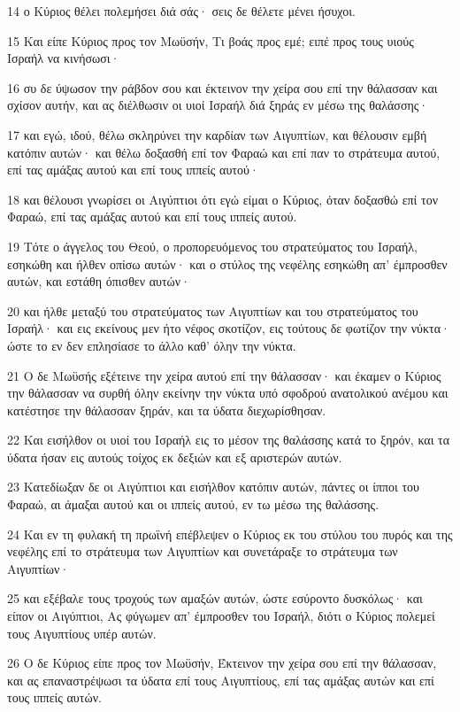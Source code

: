 \par 14 ο Κύριος θέλει πολεμήσει διά σάς· σεις δε θέλετε μένει ήσυχοι.
\par 15 Και είπε Κύριος προς τον Μωϋσήν, Τι βοάς προς εμέ; ειπέ προς τους υιούς Ισραήλ να κινήσωσι·
\par 16 συ δε ύψωσον την ράβδον σου και έκτεινον την χείρα σου επί την θάλασσαν και σχίσον αυτήν, και ας διέλθωσιν οι υιοί Ισραήλ διά ξηράς εν μέσω της θαλάσσης·
\par 17 και εγώ, ιδού, θέλω σκληρύνει την καρδίαν των Αιγυπτίων, και θέλουσιν εμβή κατόπιν αυτών· και θέλω δοξασθή επί τον Φαραώ και επί παν το στράτευμα αυτού, επί τας αμάξας αυτού και επί τους ιππείς αυτού·
\par 18 και θέλουσι γνωρίσει οι Αιγύπτιοι ότι εγώ είμαι ο Κύριος, όταν δοξασθώ επί τον Φαραώ, επί τας αμάξας αυτού και επί τους ιππείς αυτού.
\par 19 Τότε ο άγγελος του Θεού, ο προπορευόμενος του στρατεύματος του Ισραήλ, εσηκώθη και ήλθεν οπίσω αυτών· και ο στύλος της νεφέλης εσηκώθη απ' έμπροσθεν αυτών, και εστάθη όπισθεν αυτών·
\par 20 και ήλθε μεταξύ του στρατεύματος των Αιγυπτίων και του στρατεύματος του Ισραήλ· και εις εκείνους μεν ήτο νέφος σκοτίζον, εις τούτους δε φωτίζον την νύκτα· ώστε το εν δεν επλησίασε το άλλο καθ' όλην την νύκτα.
\par 21 Ο δε Μωϋσής εξέτεινε την χείρα αυτού επί την θάλασσαν· και έκαμεν ο Κύριος την θάλασσαν να συρθή όλην εκείνην την νύκτα υπό σφοδρού ανατολικού ανέμου και κατέστησε την θάλασσαν ξηράν, και τα ύδατα διεχωρίσθησαν.
\par 22 Και εισήλθον οι υιοί του Ισραήλ εις το μέσον της θαλάσσης κατά το ξηρόν, και τα ύδατα ήσαν εις αυτούς τοίχος εκ δεξιών και εξ αριστερών αυτών.
\par 23 Κατεδίωξαν δε οι Αιγύπτιοι και εισήλθον κατόπιν αυτών, πάντες οι ίπποι του Φαραώ, αι άμαξαι αυτού και οι ιππείς αυτού, εν τω μέσω της θαλάσσης.
\par 24 Και εν τη φυλακή τη πρωϊνή επέβλεψεν ο Κύριος εκ του στύλου του πυρός και της νεφέλης επί το στράτευμα των Αιγυπτίων και συνετάραξε το στράτευμα των Αιγυπτίων·
\par 25 και εξέβαλε τους τροχούς των αμαξών αυτών, ώστε εσύροντο δυσκόλως· και είπον οι Αιγύπτιοι, Ας φύγωμεν απ' έμπροσθεν του Ισραήλ, διότι ο Κύριος πολεμεί τους Αιγυπτίους υπέρ αυτών.
\par 26 Ο δε Κύριος είπε προς τον Μωϋσήν, Έκτεινον την χείρα σου επί την θάλασσαν, και ας επαναστρέψωσι τα ύδατα επί τους Αιγυπτίους, επί τας αμάξας αυτών και επί τους ιππείς αυτών.
